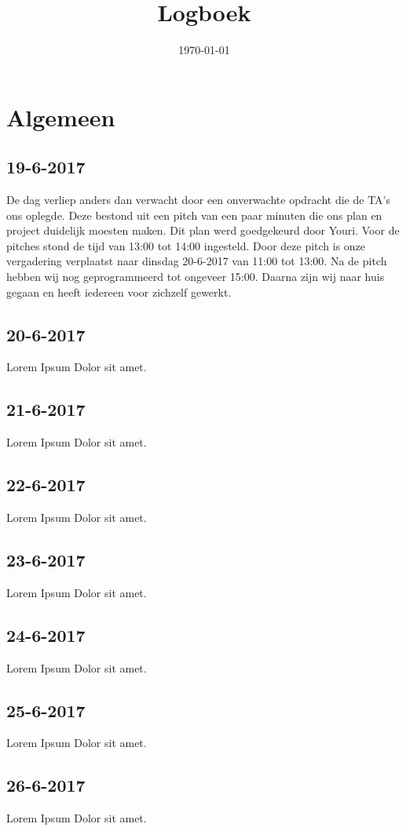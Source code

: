 \documentclass{uva-inf-article}
\title{Logboek}
\date{\today}
\begin{document}
\maketitle

\section{Algemeen}
\subsection{19-6-2017}
De dag verliep anders dan verwacht door een onverwachte opdracht die de TA's ons oplegde. Deze bestond uit een pitch van een paar minuten die ons plan en project 
duidelijk moesten maken. Dit plan werd goedgekeurd door Youri. Voor de pitches stond de tijd van 13:00 tot 14:00 ingesteld. Door deze pitch is onze vergadering verplaatst naar dinsdag 20-6-2017 van 11:00 tot 13:00.
Na de pitch hebben wij nog geprogrammeerd tot ongeveer 15:00. Daarna zijn wij naar huis gegaan en heeft iedereen voor zichzelf gewerkt.
\subsection{20-6-2017}
Lorem Ipsum Dolor sit amet.
\subsection{21-6-2017}
Lorem Ipsum Dolor sit amet.
\subsection{22-6-2017}
Lorem Ipsum Dolor sit amet.
\subsection{23-6-2017}
Lorem Ipsum Dolor sit amet.
\subsection{24-6-2017}
Lorem Ipsum Dolor sit amet.
\subsection{25-6-2017}
Lorem Ipsum Dolor sit amet.
\subsection{26-6-2017}
Lorem Ipsum Dolor sit amet.
\end{document}
